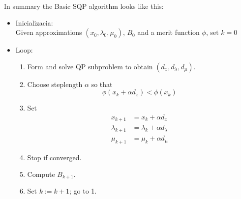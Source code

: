 In summary the Basic SQP algorithm looks like this:
\begin{itemize}
	\item Inicializacia:\\
Given approximations $(x_0,\lambda_0,\mu_0)$, $B_0$ and a merit function $\phi$, set $k=0$
\item Loop:
\begin{enumerate}
	\item Form and solve QP subproblem to obtain $(d_x,d_\lambda,d_\mu)$.
	\item Choose steplength $\alpha$ so that
	\begin{equation}
		\phi(x_k + \alpha d_x)<\phi(x_k)
	\end{equation}
	\item Set
	\begin{subequations}
		\begin{align}
		x_{k+1} &= x_k + \alpha d_x\\
		\lambda_{k+1} &= \lambda_k + \alpha d_\lambda\\
		\mu_{k+1} &= \mu_k + \alpha d_\mu
		\end{align}
	\end{subequations}
	\item Stop if converged.
	\item Compute $B_{k+1}$.
	\item Set $k := k+1$; go to 1.
\end{enumerate}
\end{itemize}